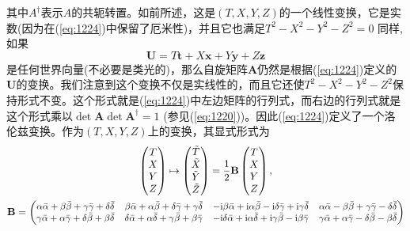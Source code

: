\documentclass[utf8]{ctexbook}
\numberwithin{equation}{section}
\begin{document}
其中$A^\dagger$表示$A$的共轭转置。如前所述，这是$(T, X, Y, Z)$的一个线性变换，它是实数(因为在(\ref{eq:1224})中保留了厄米性)，并且它也满足$T^2-X^2-Y^2-Z^2=0$
同样,如果
\begin{equation}
    \mathbf{U} = T\mathbf{t} + X\mathbf{x} + Y\mathbf{y} + Z\mathbf{z}\label{eq:1225}
\end{equation}
是任何世界向量(不必要是类光的)，那么自旋矩阵$\mathbf{A}$仍然是根据(\ref{eq:1224})定义的$\mathbf{U}$的变换。我们注意到这个变换不仅是实线性的，而且它还使$T^2-X^2-Y^2-Z^2$保持形式不变。这个形式就是(\ref{eq:1224})中左边矩阵的行列式，而右边的行列式就是这个形式乘以$\det \mathbf{A} \det \mathbf{A^\dagger}=1$ (参见(\ref{eq:1220}))。因此(\ref{eq:1224})定义了一个洛伦兹变换。作为$(T,X,Y,Z)$上的变换，其显式形式为
\begin{gather}
        \begin{pmatrix}
            T\\X\\Y\\Z
        \end{pmatrix}\mapsto
        \begin{pmatrix}
            \tilde{T}\\\tilde{X}\\\tilde{Y}\\\tilde{Z}
        \end{pmatrix}=\frac{1}{2}\mathbf{B}
        \begin{pmatrix}
            T\\X\\Y\\Z
        \end{pmatrix},\nonumber\\
        \mathbf{B}=
        \small{\small{\begin{pmatrix} 
            \alpha  \bar{\alpha }+\beta  \bar{\beta }+\gamma  \bar{\gamma }+\delta  \bar{\delta }& \beta  \bar{\alpha}+\alpha  \bar{\beta }+\delta  \bar{\gamma }+\gamma  \bar{\delta }& -\mathrm{i} \beta  \bar{\alpha }+\mathrm{i} \alpha  \bar{\beta }-\mathrm{i}\delta  \bar{\gamma }+\mathrm{i} \gamma  \bar{\delta }& \alpha  \bar{\alpha }-\beta  \bar{\beta }+\gamma  \bar{\gamma }-\delta \bar{\delta }\\
            \gamma  \bar{\alpha }+\alpha  \bar{\gamma }+\delta  \bar{\beta }+\beta  \bar{\delta }& \delta\bar{\alpha }+\alpha  \bar{\delta }+\gamma  \bar{\beta }+\beta  \bar{\gamma }& -\mathrm{i} \delta  \bar{\alpha }+\mathrm{i} \alpha \bar{\delta }+\mathrm{i} \gamma  \bar{\beta }-\mathrm{i} \beta  \bar{\gamma }& \gamma  \bar{\alpha }+\alpha  \bar{\gamma }-\delta \bar{\beta }-\beta  \bar{\delta }\\ 

\end{pmatrix}}}
\end{gather}
\end{document}
